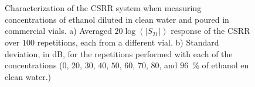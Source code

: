 \documentclass[journal,twoside,web]{ieeecolor}
\begin{document}
\begin{figure}[!t]
	\centering
	\caption{Characterization of the CSRR system when measuring concentrations of ethanol diluted in clean water and poured in commercial vials. a) Averaged $20\dot{\log\left(|S_{21}|\right)}$ response of the CSRR over $100$ repetitions, each from a different vial. b) Standard deviation, in dB, for the repetitions performed with each of the concentrations ($0$, $20$, $30$, $40$, $50$, $60$, $70$, $80$, and $96$~$\%$ of ethanol en clean water.)}
	\label{fig:avgData}
\end{figure}
\end{document}
